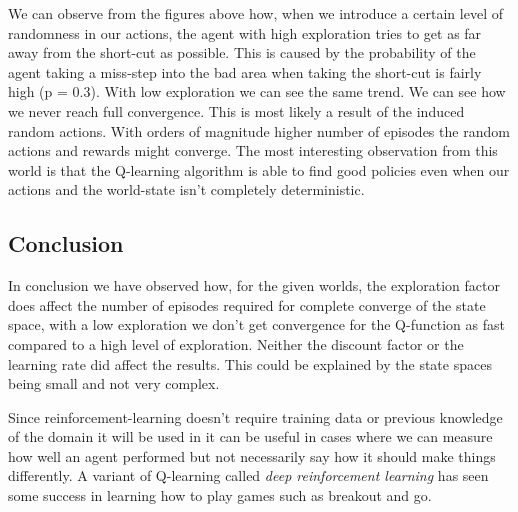\documentclass[a4paper,12pt]{article}
\begin{document}
We can observe from the figures above how, when we introduce a certain level of randomness in our actions, the agent with high exploration tries to get as far away from the short-cut as possible. This is caused by the probability of the agent taking a miss-step into the bad area when taking the short-cut is fairly high (p = 0.3). With low exploration we can see the same trend. We can see how we never reach full convergence. This is most likely a result of the induced random actions. With orders of magnitude higher number of episodes the random actions and rewards might converge. The most interesting observation from this world is that the Q-learning algorithm is able to find good policies even when our actions and the world-state isn't completely deterministic. 

\subsection{Conclusion}

In conclusion we have observed how, for the given worlds, the exploration factor does affect the number of episodes required for complete converge of the state space, with a low exploration we don't get convergence for the Q-function as fast compared to a high level of exploration. Neither the discount factor or the learning rate did affect the results. This could be explained by the state spaces being small and not very complex.

Since reinforcement-learning doesn't require training data or previous knowledge of the domain it will be used in it can be useful in cases where we can measure how well an agent performed but not necessarily say how it should make things differently. A variant of Q-learning called \textit{deep reinforcement learning} has seen some success in learning how to play games such as breakout and go. 
\end{document}
